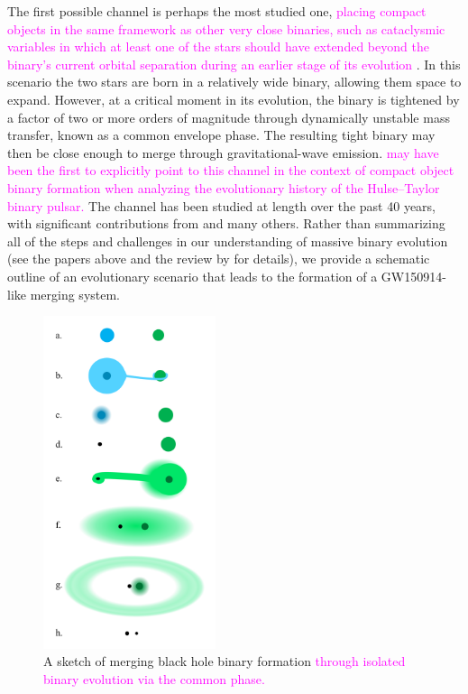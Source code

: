 \documentclass[iop,onecolumn]{revtex4}
\newcommand{\ilya}[1]{\textcolor{magenta}{#1}}
\begin{document}
The first possible channel is perhaps the most studied one, \ilya{placing compact objects in the same framework as other very close binaries, such as cataclysmic variables in which at least one of the stars should have extended beyond the binary's current orbital separation during an earlier stage of its evolution \citep[e.g.,][]{Paczynski:1976}}.  In this scenario the two stars are born in a relatively wide binary, allowing them space to expand.  However, at a critical moment in its evolution, the binary is tightened by a factor of two or more orders of magnitude through dynamically unstable mass transfer, known as a common envelope phase. The resulting tight binary may then be close enough to merge through gravitational-wave emission.  \ilya{\citet{SmarrBlandford:1976} may have been the first to explicitly point to this channel in the context of compact object binary formation when analyzing the evolutionary history of the Hulse--Taylor binary pulsar.} The channel has been studied at length over the past 40 years, with significant contributions from \citet{TutukovYungelson:1993,Lipunov:1997,BetheBrown:1998,Nelemans:2003,VossTauris:2003,Pfahl:2005,Dewi:2006,Kalogera:2007,OShaughnessy:2008,Dominik:2012,Belczynski:2016,EldridgeStanway:2016} and many others. Rather than summarizing all of the steps and challenges in our understanding of massive binary evolution (see the papers above and the review by \citet{PostnovYungelson:2014} for details), we provide a schematic outline of an evolutionary scenario that leads to the formation of a GW150914-like merging system.

\begin{figure}
	\centering
	\includegraphics[width=0.45\textwidth]{channel1.png}
	\caption{\label{fig:isol_binary} A sketch of merging black hole binary formation \ilya{through isolated binary evolution via the common phase.}}
\end{figure}
\end{document}
